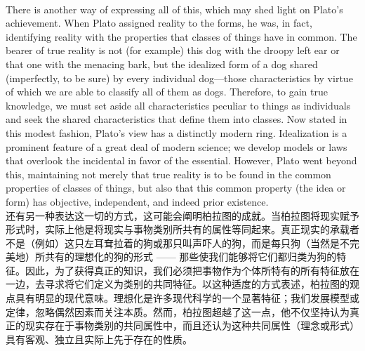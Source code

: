 \documentclass{article}
\begin{document}
\\
There is another way of expressing all of this, which may shed light on Plato’s achievement. When Plato assigned reality to the forms, he was, in fact, identifying reality with the properties that classes of things have in common. The bearer of true reality is not (for example) this dog with the droopy left ear or that one with the menacing bark, but the idealized form of a dog shared (imperfectly, to be sure) by every individual dog—those characteristics by virtue of which we are able to classify all of them as dogs. Therefore, to gain true knowledge, we must set aside all characteristics peculiar to things as individuals and seek the shared characteristics that define them into classes. Now stated in this modest fashion, Plato’s view has a distinctly modern ring. Idealization is a prominent feature of a great deal of modern science; we develop models or laws that overlook the incidental in favor of the essential. However, Plato went beyond this, maintaining not merely that true reality is to be found in the common properties of classes of things, but also that this common property (the idea or form) has objective, independent, and indeed prior existence.\\
还有另一种表达这一切的方式，这可能会阐明柏拉图的成就。当柏拉图将现实赋予形式时，实际上他是将现实与事物类别所共有的属性等同起来。真正现实的承载者不是（例如）这只左耳耷拉着的狗或那只叫声吓人的狗，而是每只狗（当然是不完美地）所共有的理想化的狗的形式 —— 那些使我们能够将它们都归类为狗的特征。因此，为了获得真正的知识，我们必须把事物作为个体所特有的所有特征放在一边，去寻求将它们定义为类别的共同特征。以这种适度的方式表述，柏拉图的观点具有明显的现代意味。理想化是许多现代科学的一个显著特征；我们发展模型或定律，忽略偶然因素而关注本质。然而，柏拉图超越了这一点，他不仅坚持认为真正的现实存在于事物类别的共同属性中，而且还认为这种共同属性（理念或形式）具有客观、独立且实际上先于存在的性质。\\
\newpage
\end{document}
